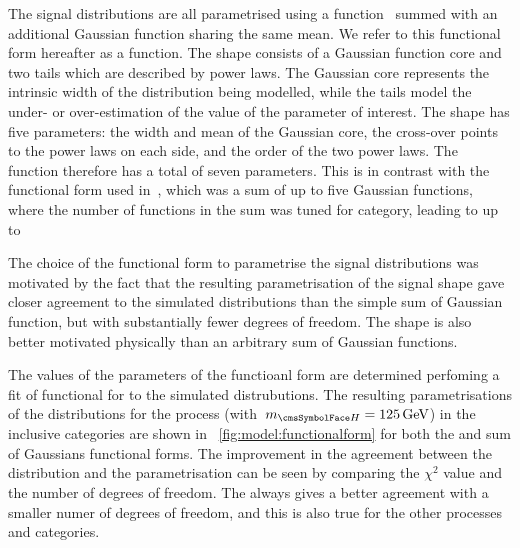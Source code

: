 The signal \mgg distributions are all parametrised using a \DCB function~\cite{CrystalBallFunction} summed with an additional Gaussian function sharing the same mean. We refer to this functional form hereafter as a \DCBpG function. %
The \DCB shape consists of a Gaussian function core and two tails which are described by power laws. The Gaussian core represents the intrinsic width of the distribution being modelled, while the tails model the under- or over-estimation of the value of the parameter of interest. %
The \DCB shape has five parameters: the width and mean of the Gaussian core, the cross-over points to the power laws on each side, and the order of the two power laws. The \DCBpG function therefore has a total of seven parameters. This is in contrast with the functional form used in~\cite{PAS-HIG-16-020}, which was a sum of up to five Gaussian functions, where the number of functions in the sum was tuned for category, leading to up to 

The choice of the \DCBpG functional form to parametrise the signal \mgg distributions was motivated by the fact that the resulting parametrisation of the signal shape gave closer agreement to the simulated distributions than the simple sum of Gaussian function, but with substantially fewer degrees of freedom. The \DCB shape is also better motivated physically than an arbitrary sum of Gaussian functions. 

The values of the parameters of the functioanl form are determined perfoming a \NLL fit of functional for to the simulated \mgg distrubutions. The resulting parametrisations of the \mgg distributions for the \ggH process (with $\mH=125\GeV$) in the inclusive categories are shown in \Fig~\ref{fig:model:functionalform} for both the \DCBpG and sum of Gaussians functional forms. The improvement in the agreement between the distribution and the parametrisation can be seen by comparing the $\chi^2$ value and the number of degrees of freedom. The \DCBpG always gives a better agreement with a smaller numer of degrees of freedom, and this is also true for the other processes and categories.

